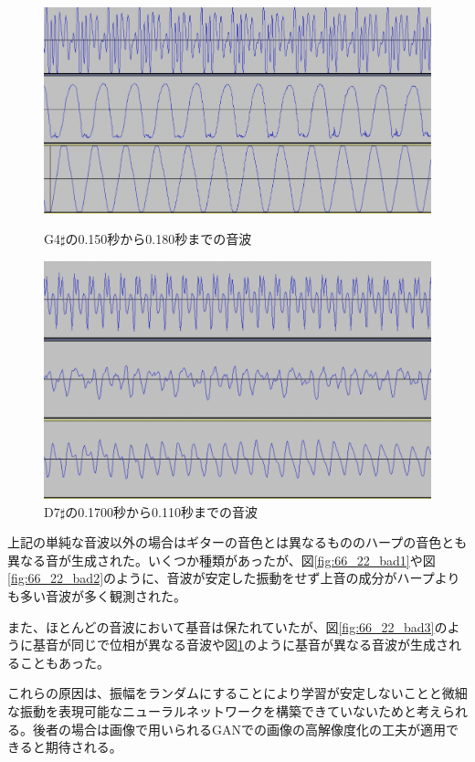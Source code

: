 \begin{description}
\begin{figure}[t]
\begin{center}
\begin{minipage}{0.48\hsize}
\begin{center}
\includegraphics[width=0.9\hsize]{figure/66_22_det/g4s_0150_0180.png}
\caption{G4$\sharp$の0.150秒から0.180秒までの音波}
\label{fig:66_22_bad3}
\end{center}
\end{minipage}
\begin{minipage}{0.48\hsize}
\begin{center}
\includegraphics[width=0.9\hsize]{figure/66_22_det/d7s_0100_0110.png}
\caption{D7$\sharp$の0.1700秒から0.110秒までの音波}
\label{fig:66_22_bad4}
\end{center}
\end{minipage}
\end{center}
\end{figure}

上記の単純な音波以外の場合はギターの音色とは異なるもののハープの音色とも異なる音が生成された。いくつか種類があったが、図\ref{fig:66_22_bad1}や図\ref{fig:66_22_bad2}のように、音波が安定した振動をせず上音の成分がハープよりも多い音波が多く観測された。

また、ほとんどの音波において基音は保たれていたが、図\ref{fig:66_22_bad3}のように基音が同じで位相が異なる音波や図\ref{fig:66_22_bad4}のように基音が異なる音波が生成されることもあった。

これらの原因は、振幅をランダムにすることにより学習が安定しないことと微細な振動を表現可能なニューラルネットワークを構築できていないためと考えられる。後者の場合は画像で用いられるGANでの画像の高解像度化の工夫が適用できると期待される。

\end{description}